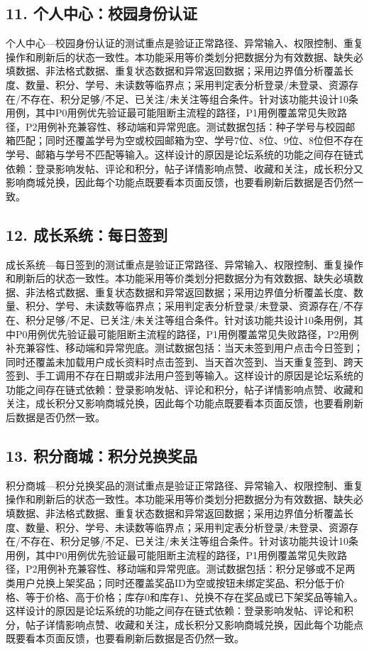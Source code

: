 \documentclass[UTF8,zihao=-4]{ctexart}
\begin{document}
\subsection{11. 个人中心：校园身份认证}
个人中心—校园身份认证的测试重点是验证正常路径、异常输入、权限控制、重复操作和刷新后的状态一致性。本功能采用等价类划分把数据分为有效数据、缺失必填数据、非法格式数据、重复状态数据和异常返回数据；采用边界值分析覆盖长度、数量、积分、学号、未读数等临界点；采用判定表分析登录/未登录、资源存在/不存在、积分足够/不足、已关注/未关注等组合条件。针对该功能共设计10条用例，其中P0用例优先验证最可能阻断主流程的路径，P1用例覆盖常见失败路径，P2用例补充兼容性、移动端和异常兜底。测试数据包括：种子学号与校园邮箱匹配；同时还覆盖学号为空或校园邮箱为空、学号7位、8位、9位、8位但不存在学号、邮箱与学号不匹配等输入。这样设计的原因是论坛系统的功能之间存在链式依赖：登录影响发帖、评论和积分，帖子详情影响点赞、收藏和关注，成长积分又影响商城兑换，因此每个功能点既要看本页面反馈，也要看刷新后数据是否仍然一致。

\subsection{12. 成长系统：每日签到}
成长系统—每日签到的测试重点是验证正常路径、异常输入、权限控制、重复操作和刷新后的状态一致性。本功能采用等价类划分把数据分为有效数据、缺失必填数据、非法格式数据、重复状态数据和异常返回数据；采用边界值分析覆盖长度、数量、积分、学号、未读数等临界点；采用判定表分析登录/未登录、资源存在/不存在、积分足够/不足、已关注/未关注等组合条件。针对该功能共设计10条用例，其中P0用例优先验证最可能阻断主流程的路径，P1用例覆盖常见失败路径，P2用例补充兼容性、移动端和异常兜底。测试数据包括：当天未签到用户点击今日签到；同时还覆盖未加载用户成长资料时点击签到、当天首次签到、当天重复签到、跨天签到、手工调用不存在日期或非法用户签到等输入。这样设计的原因是论坛系统的功能之间存在链式依赖：登录影响发帖、评论和积分，帖子详情影响点赞、收藏和关注，成长积分又影响商城兑换，因此每个功能点既要看本页面反馈，也要看刷新后数据是否仍然一致。

\subsection{13. 积分商城：积分兑换奖品}
积分商城—积分兑换奖品的测试重点是验证正常路径、异常输入、权限控制、重复操作和刷新后的状态一致性。本功能采用等价类划分把数据分为有效数据、缺失必填数据、非法格式数据、重复状态数据和异常返回数据；采用边界值分析覆盖长度、数量、积分、学号、未读数等临界点；采用判定表分析登录/未登录、资源存在/不存在、积分足够/不足、已关注/未关注等组合条件。针对该功能共设计10条用例，其中P0用例优先验证最可能阻断主流程的路径，P1用例覆盖常见失败路径，P2用例补充兼容性、移动端和异常兜底。测试数据包括：积分足够或不足两类用户兑换上架奖品；同时还覆盖奖品ID为空或按钮未绑定奖品、积分低于价格、等于价格、高于价格；库存0和库存1、兑换不存在奖品或已下架奖品等输入。这样设计的原因是论坛系统的功能之间存在链式依赖：登录影响发帖、评论和积分，帖子详情影响点赞、收藏和关注，成长积分又影响商城兑换，因此每个功能点既要看本页面反馈，也要看刷新后数据是否仍然一致。
\end{document}
